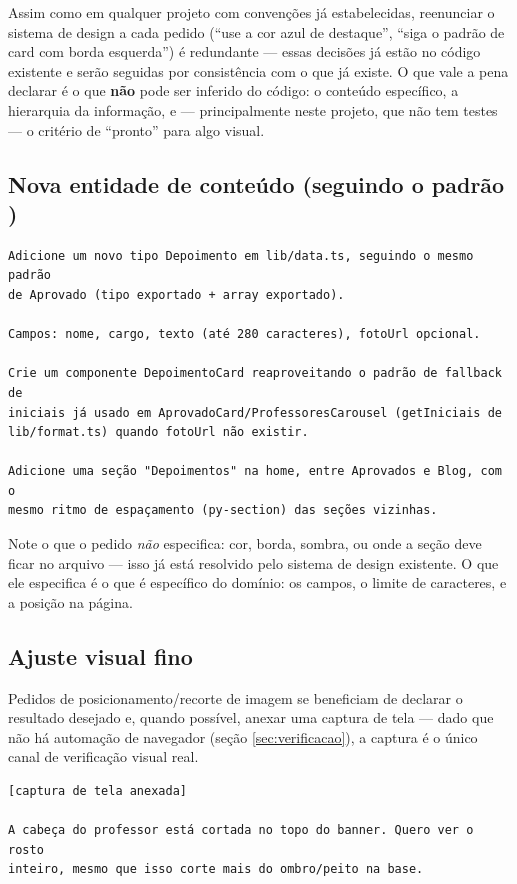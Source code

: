 Assim como em qualquer projeto com convenções já estabelecidas, reenunciar o
sistema de design a cada pedido (``use a cor azul de destaque'', ``siga o
padrão de card com borda esquerda'') é redundante --- essas decisões já estão
no código existente e serão seguidas por consistência com o que já existe. O
que vale a pena declarar é o que \textbf{não} pode ser inferido do código: o
conteúdo específico, a hierarquia da informação, e --- principalmente neste
projeto, que não tem testes --- o critério de ``pronto'' para algo visual.

\subsection{Nova entidade de conteúdo (seguindo o padrão )}

\begin{lstlisting}[style=plain]
Adicione um novo tipo Depoimento em lib/data.ts, seguindo o mesmo padrão
de Aprovado (tipo exportado + array exportado).

Campos: nome, cargo, texto (até 280 caracteres), fotoUrl opcional.

Crie um componente DepoimentoCard reaproveitando o padrão de fallback de
iniciais já usado em AprovadoCard/ProfessoresCarousel (getIniciais de
lib/format.ts) quando fotoUrl não existir.

Adicione uma seção "Depoimentos" na home, entre Aprovados e Blog, com o
mesmo ritmo de espaçamento (py-section) das seções vizinhas.
\end{lstlisting}

Note o que o pedido \emph{não} especifica: cor, borda, sombra, ou onde a
seção deve ficar no arquivo  --- isso já está
resolvido pelo sistema de design existente. O que ele especifica é o que é
específico do domínio: os campos, o limite de caracteres, e a posição na
página.

\subsection{Ajuste visual fino}

Pedidos de posicionamento/recorte de imagem se beneficiam de declarar o
resultado desejado e, quando possível, anexar uma captura de tela --- dado que
não há automação de navegador (seção \ref{sec:verificacao}), a captura é o
único canal de verificação visual real.

\begin{lstlisting}[style=plain]
[captura de tela anexada]

A cabeça do professor está cortada no topo do banner. Quero ver o rosto
inteiro, mesmo que isso corte mais do ombro/peito na base.
\end{lstlisting}

